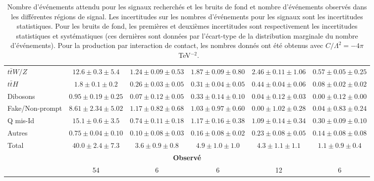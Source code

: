 \begin{table}[!htb]
\begin{center}
{\begin{tabular}{|l | c | c | c | c |c | }
       $t\bar{t}W/Z$            & $12.6 \pm 0.3 \pm 5.4$       & $1.24 \pm 0.09\pm 0.53$& $1.87 \pm 0.09\pm 0.80$ & $2.46 \pm 0.11\pm 1.06$ & $0.57\pm 0.05 \pm 0.25$ \\
      $t\bar{t}H$                & $1.8 \pm 0.1 \pm 0.2$           & $ 0.26 \pm 0.03 \pm 0.05$&  $0.31 \pm 0.04\pm 0.05$ & $0.44\pm 0.04\pm 0.06$ & $0.08\pm 0.02\pm 0.02$\\
       Dibosons                    & $0.95 \pm 0.19\pm 0.25$       & $0.07 \pm 0.12 \pm 0.05$ & $0.33\pm 0.14\pm 0.10$ & $0.04\pm 0.12\pm 0.03$ & $0.00\pm 0.12\pm 0.00$ \\
       Fake/Non-prompt   & $8.61 \pm 2.34 \pm 5.02$ & $1.17 \pm 0.82 \pm 0.68$&  $1.03\pm 0.97 \pm 0.60$ & $0.00\pm 1.02 \pm 0.28$ & $0.04\pm 0.83 \pm 0.24$\\    
       Q mis-Id                    & $15.1 \pm 0.6 \pm 3.5$           & $0.74 \pm 0.11 \pm 0.18$&  $1.17\pm 0.16 \pm 0.38$ & $1.09\pm 0.14 \pm 0.34$ & $0.30\pm 0.09 \pm 0.10$\\  
      Autres                        & $0.75 \pm 0.04 \pm 0.10$      & $0.10 \pm 0.08 \pm 0.03$ &  $0.16\pm 0.08\pm 0.02$ & $0.23\pm 0.08\pm 0.05$ & $0.14\pm 0.08\pm 0.08$\\        
\hdashline
       Total               & $40.0 \pm 2.4 \pm 7.3 $ & $3.6 \pm 0.9 \pm 0.8$ & $4.9 \pm 1.0 \pm 1.0 $ & $4.3 \pm 1.1 \pm 1.1 $ & $1.1 \pm 0.9 \pm 0.4 $\\

      \hline
       \multicolumn{6}{c}{\bf Observ\'e} \\ \cline{2-6}
       \multicolumn{1}{c|}{}                         & 54 & 6 & 6 & 12 & 6 \\ \cline{2-6}
    \end{tabular}}
    \caption{Nombre d'\'ev\'enements attendu pour les signaux recherchés et les bruits de fond et nombre d'événements observés dans les diff\'erentes r\'egions de signal. Les incertitudes sur les nombres d'\'ev\'enements pour les signaux sont les incertitudes statistiques. Pour les bruits de fond, les premi\`eres et deuxi\`emes incertitudes sont respectivement les incertitudes statistiques et syst\'ematiques (ces derni\`eres sont donn\'ees par l'\'ecart-type de la distribution marginale du nombre d'\'ev\'enements). Pour la production par interaction de contact, les nombres donn\'es ont \'et\'e obtenus avec $C/\Lambda^2=-4\pi$~TeV$^{-2}$.\label{tab:allYields}}
  \end{center}
\end{table}

